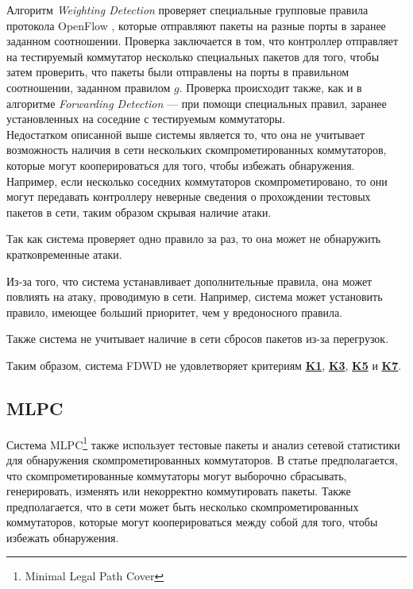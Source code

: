 \documentclass[../thesis.tex]{subfiles}
\begin{document}
Алгоритм \textit{Weighting Detection} проверяет специальные групповые правила  протокола OpenFlow \cite{openflow15}, которые отправляют пакеты на разные порты в заранее заданном соотношении.
Проверка заключается в том, что контроллер отправляет на тестируемый коммутатор несколько специальных пакетов для того, чтобы затем проверить, что пакеты были отправлены на порты в правильном соотношении, заданном правилом $g$.
Проверка происходит также, как и в алгоритме \textit{Forwarding Detection} --- при помощи специальных правил, заранее установленных на соседние с тестируемым коммутаторы.
\\

Недостатком описанной выше системы является то, что она не учитывает возможность наличия в сети нескольких скомпрометированных коммутаторов, которые могут кооперироваться для того, чтобы избежать обнаружения.
Например, если несколько соседних коммутаторов скомпрометировано, то они могут передавать контроллеру неверные сведения о прохождении тестовых пакетов в сети, таким образом скрывая наличие атаки.

Так как система проверяет одно правило за раз, то она может не обнаружить кратковременные атаки.

Из-за того, что система устанавливает дополнительные правила, она может повлиять на атаку, проводимую в сети.
Например, система может установить правило, имеющее больший приоритет, чем у вредоносного правила.

Также система не учитывает наличие в сети сбросов пакетов из-за перегрузок.

{
\hypersetup{linkcolor=black}

Таким образом, система FDWD не удовлетворяет критериям \hyperref[criterion:K1]{\textbf{K1}}, \hyperref[criterion:K3]{\textbf{K3}}, \hyperref[criterion:K5]{\textbf{K5}} и \hyperref[criterion:K7]{\textbf{K7}}.
}

\subsection{MLPC} \label{subsection:system5}

Система MLPC\footnote{Minimal Legal Path Cover} \cite{chao2016securing} также использует тестовые пакеты и анализ сетевой статистики для обнаружения скомпрометированных коммутаторов. 
В статье \cite{chao2016securing} предполагается, что скомпрометированные коммутаторы могут выборочно сбрасывать, генерировать, изменять или некорректно коммутировать пакеты.
Также предполагается, что в сети может быть несколько скомпрометированных коммутаторов, которые могут кооперироваться между собой для того, чтобы избежать обнаружения.
\end{document}
